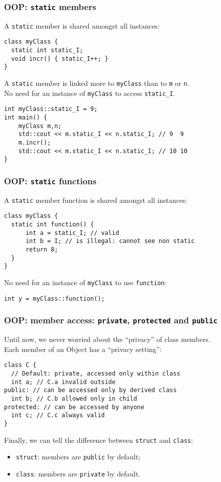 \documentclass{beamer}
\newcommand{\code}[1]{{\color{cgreen}\texttt{#1}}}
\begin{document}
\begin{frame}[fragile]
 \frametitle{OOP: \code{static} members}
 A \code{static} member is shared amongst all instances:
 \begin{lstlisting}
class myClass {
  static int static_I;
  void incr() { static_I++; }
}
 \end{lstlisting}
 A \code{static} member is linked more to \code{myClass} than to \code{m} or \code{n}. \\
 No need for an instance of \code{myClass} to access \code{static\_I}.
 \begin{lstlisting}
int myClass::static_I = 9;
int main() {
    myClass m,n;
    std::cout << m.static_I << n.static_I; // 9  9
    m.incr();
    std::cout << m.static_I << n.static_I; // 10 10
}
 \end{lstlisting}
\end{frame}

\begin{frame}[fragile]
 \frametitle{OOP: \code{static} functions}
 A \code{static} member function is shared amongst all instances:
 \begin{lstlisting}
class myClass {
  static int function() {
      int a = static_I; // valid
      int b = I; // is illegal: cannot see non static
      return 8;
  }
}
 \end{lstlisting}
 No need for an instance of \code{myClass} to use \code{function}:
 \begin{lstlisting}
int y = myClass::function();
 \end{lstlisting}
\end{frame}
  
\begin{frame}[fragile]
 \frametitle{OOP: member access: \code{private}, \code{protected} and \code{public}}
 Until now, we never worried about the ``privacy'' of class members. \\
 Each member of an Object has a ``privacy setting'':
 \begin{lstlisting}
class C {
  // Default: private, accessed only within class
  int a; // C.a invalid outside
public: // can be accessed only by derived class
  int b; // C.b allowed only in child
protected: // can be accessed by anyone
  int c; // C.c always valid
}
 \end{lstlisting}
 Finally, we can tell the difference between \code{struct} and \code{class}:
 \begin{itemize}
  \item \code{struct}: members are \code{public} by default;
  \item \code{class}: members are \code{private} by default.
 \end{itemize}
\end{frame}
\end{document}
